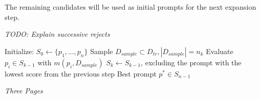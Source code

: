 The remaining candidates will be used as initial prompts for the next expansion step.

\textit{TODO: Explain successive rejects}

\begin{algorithm}
\caption{}
\begin{algorithmic}[1]
    \State Initialize: $S_0 \gets \{p_1, \dots , p_n\}$
        \State Sample $D_{sample} \subset D_{tr}, |D_{sample}| = n_k$
        \State Evaluate $p_i \in S_{k−1}$ with $m(p_i, D_{sample})$
        \State $S_k \gets S_{k−1}$, excluding the prompt with the lowest score from the previous step
    \EndFor
    \State \Return Best prompt $p^* \in S_{n-1}$
\end{algorithmic}
\end{algorithm}


\textit{Three Pages}